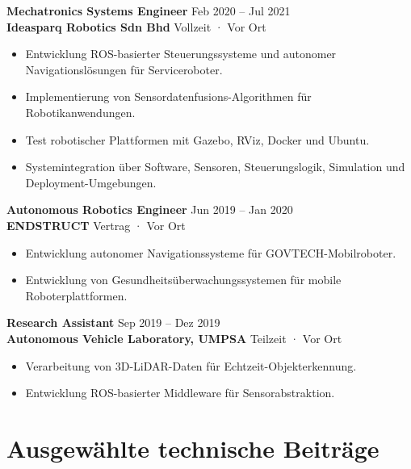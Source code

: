 \documentclass[11pt,a4paper]{article}
\begin{document}
\textbf{\color{PrimaryColor}Mechatronics Systems Engineer} \hfill Feb 2020 -- Jul 2021\\
\textbf{Ideasparq Robotics Sdn Bhd} \hfill Vollzeit · Vor Ort

\begin{itemize}
    \item Entwicklung ROS-basierter Steuerungssysteme und autonomer Navigationslösungen für Serviceroboter.
    \item Implementierung von Sensordatenfusions-Algorithmen für Robotikanwendungen.
    \item Test robotischer Plattformen mit Gazebo, RViz, Docker und Ubuntu.
    \item Systemintegration über Software, Sensoren, Steuerungslogik, Simulation und Deployment-Umgebungen.
\end{itemize}

\textbf{\color{PrimaryColor}Autonomous Robotics Engineer} \hfill Jun 2019 -- Jan 2020\\
\textbf{ENDSTRUCT} \hfill Vertrag · Vor Ort

\begin{itemize}
    \item Entwicklung autonomer Navigationssysteme für GOVTECH-Mobilroboter.
    \item Entwicklung von Gesundheitsüberwachungssystemen für mobile Roboterplattformen.
\end{itemize}

\textbf{\color{PrimaryColor}Research Assistant} \hfill Sep 2019 -- Dez 2019\\
\textbf{Autonomous Vehicle Laboratory, UMPSA} \hfill Teilzeit · Vor Ort

\begin{itemize}
    \item Verarbeitung von 3D-LiDAR-Daten für Echtzeit-Objekterkennung.
    \item Entwicklung ROS-basierter Middleware für Sensorabstraktion.
\end{itemize}

\section*{Ausgewählte technische Beiträge}
\end{document}
